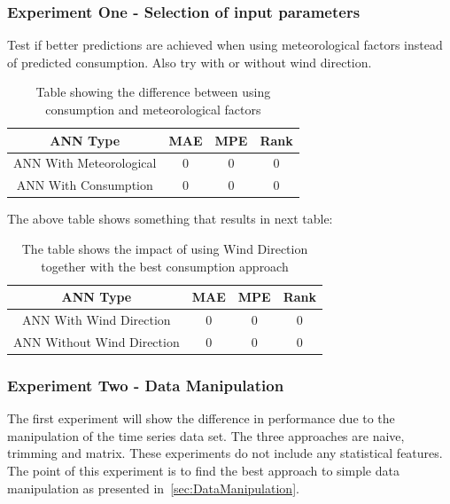 
\subsubsection{Experiment One - Selection of input parameters}
Test if better predictions are achieved when using meteorological factors instead of predicted consumption. Also try with or without wind direction.

\begin{table}[H]
\centering  %
\begin{tabular}{c c c c} %
ANN Type & MAE & MPE & Rank \\ [0.5ex] %
\hline                  %
ANN With Meteorological & 0 & 0 & 0 \\ %
ANN With Consumption & 0 & 0 & 0 \\ [1ex] %
\hline %
\end{tabular}
\caption{Table showing the difference between using consumption and meteorological factors} %
\label{table:consumptionInclusionTable} %
\end{table}

The above table shows something that results in next table:
\begin{table}[H]
\centering  %
\begin{tabular}{c c c c} %
ANN Type & MAE & MPE & Rank \\ [0.5ex] %
\hline                  %
ANN With Wind Direction & 0 & 0 & 0 \\
ANN Without Wind Direction & 0 & 0 & 0 \\ [1ex] %
\hline %
\end{tabular}
\caption{The table shows the impact of using Wind Direction together with the best consumption approach} %
\label{table:windDirectionInclusion} %
\end{table}

\subsubsection{Experiment Two - Data Manipulation}
The first experiment will show the difference in performance due to the manipulation of the time series data set. The three approaches are naive, trimming and matrix. These experiments do not include any statistical features. The point of this experiment is to find the best approach to simple data manipulation as presented in~\ref{sec:DataManipulation}.

